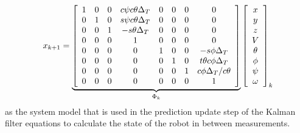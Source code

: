 \begin{align*}
x_{k+1} = 
\underbrace{\left[\begin{array}{c c c c c c c c}
1 & 0 & 0 & c\psi c\theta \Delta_T & 0 & 0 & 0 & 0 \\
0 & 1 & 0 & s\psi c\theta \Delta_T & 0 & 0 & 0 & 0\\
0 & 0 & 1 & -s\theta \Delta_T & 0 & 0 & 0 & 0\\
0 & 0 & 0 & 1 & 0 & 0 & 0 & 0 \\
0 & 0 & 0 & 0 & 1 & 0 & 0 & -s\phi \Delta_T \\
0 & 0 & 0 & 0 & 0 & 1 & 0 & t\theta c\phi \Delta_T \\
0 & 0 & 0 & 0 & 0 & 0 & 1 & c\phi \Delta_T/c\theta \\
0 & 0 & 0 & 0 & 0 & 0 & 0 & 1
\end{array}\right]}_{\Phi_k}
\left[\begin{array}{c}
x \\ y \\ z \\ V \\ \theta \\ \phi \\ \psi \\ \omega
\end{array}\right]_k
\end{align*}
as the system model that is used in the prediction update step of the Kalman filter equations to calculate the state of the robot in between measurements.
%

